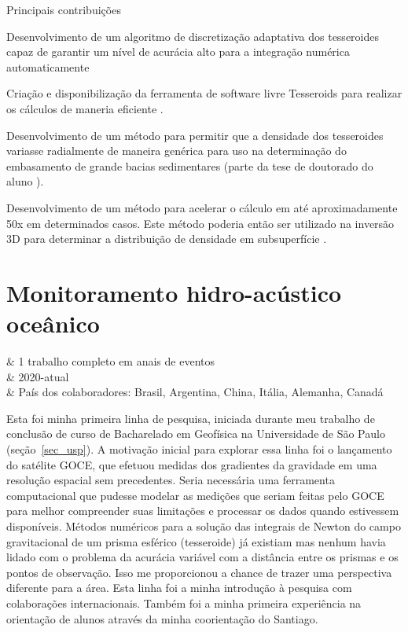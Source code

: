 \documentclass[10pt,a4paper,oneside]{book}
\begin{document}
\begin{fancyenum}{\faLightbulb}{Principais contribuições}
  \item Desenvolvimento de um algoritmo de discretização adaptativa dos tesseroides capaz de garantir um nível de acurácia alto para a integração numérica automaticamente 
  \item Criação e disponibilização da ferramenta de software livre Tesseroids para realizar os cálculos de maneria eficiente \citep{Uieda2016}.
  \item Desenvolvimento de um método para permitir que a densidade dos tesseroides variasse radialmente de maneira genérica \citep{Soler2019} para uso na determinação do embasamento de grande bacias sedimentares (parte da tese de doutorado do aluno \SantiagoLink{}).
  \item Desenvolvimento de um método para acelerar o cálculo em até aproximadamente 50x em determinados casos. Este método poderia então ser utilizado na inversão 3D para determinar a distribuição de densidade em subsuperfície \citep[][em colaboração com pesquisadores da Central South University, China, e GFZ Potsdam, Alemanha]{Zhao2019}.
\end{fancyenum}


\section{Monitoramento hidro-acústico oceânico}
\label{sec_monitor_acus}

\begin{summarybox}[frametitle=\faInfoCircle{}\quad Resumo da linha de pesquisa]
	\begin{fa-ul}
		\faBriefcase & 1 trabalho completo em anais de eventos \\
		\faBicycle & 2020-atual \\
		\faBullhorn & País dos colaboradores: Brasil, Argentina, China, Itália, Alemanha, Canadá
	\end{fa-ul}
\end{summarybox}

Esta foi minha primeira linha de pesquisa, iniciada durante meu trabalho de conclusão de curso de Bacharelado em Geofísica na Universidade de São Paulo
(seção~\ref{sec_usp}). A motivação inicial para explorar essa linha foi o lançamento do satélite GOCE, que efetuou medidas dos gradientes da gravidade em uma resolução espacial
sem precedentes. Seria necessária uma ferramenta computacional que pudesse modelar as medições que seriam feitas pelo GOCE para melhor compreender suas limitações e processar
os dados quando estivessem disponíveis. Métodos numéricos para a solução das integrais de Newton do campo gravitacional de um prisma esférico (tesseroide) já existiam
\citep{Heck2006,Asgharzadeh2007,WildPfeiffer2008} mas nenhum havia lidado com o problema da acurácia variável com a distância entre os prismas e os pontos de
observação. Isso me proporcionou a chance de trazer uma perspectiva diferente para a área. Esta linha foi a minha introdução à pesquisa com colaborações internacionais.
Também foi a minha primeira experiência na orientação de alunos através da minha coorientação do Santiago.
\end{document}
